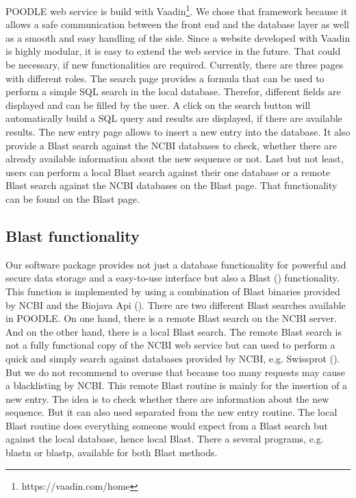 \documentclass{bioinfo}
\begin{document}
\begin{methods}
POODLE web service is build with Vaadin\footnote{https://vaadin.com/home}. We chose that framework 
because it allows a safe 
communication between the front end and the database layer as well as a smooth and easy handling of 
the side. Since a website developed with Vaadin is highly modular, it is easy to extend the web 
service in the future. That could be necessary, if new functionalities are required. Currently, 
there are three pages with different roles. The search page provides a formula that can be used 
to perform a simple SQL search in the local database. Therefor, different fields are displayed and 
can be filled by the user. A click on the search button will automatically build a SQL query and 
results are displayed, if there are available results. The new entry page allows to insert a new 
entry into the database. It also provide a Blast search against the NCBI databases to check, whether 
there are already available information about the new sequence or not. Last but not least, users can 
perform a local Blast search against their one database or a remote Blast search against the NCBI 
databases on the Blast page. That functionality can be found on the Blast page. 

\subsection{Blast functionality}

Our software package provides not just a database functionality for powerful and secure data storage 
and a easy-to-use interface but also a Blast (\citealp{Altschul01}) functionality. This function 
is implemented by using a combination of Blast binaries provided by NCBI and the Biojava Api 
(\citealp{Prlic01}). There are two different Blast searches available in POODLE. On one hand, there 
is a remote Blast search on the NCBI server. And on the other hand, there is a local Blast search. 
The remote Blast search is not a fully functional copy of the NCBI web service but can used to 
perform a quick and simply search against databases provided by NCBI, e.g. Swissprot (\citealp{Doni01}). But we 
do not recommend to overuse that because too many requests may cause a blacklisting by NCBI. This 
remote Blast routine is mainly for the insertion of a new entry. The idea is to check whether there 
are information about the new sequence. But it can also used separated from the new entry routine. 
The local Blast routine does everything someone would 
expect from a Blast search but against the local database, hence local Blast. There a several programs, 
e.g. blastn or blastp, available for both Blast methods. 

\end{methods}
\end{document}
